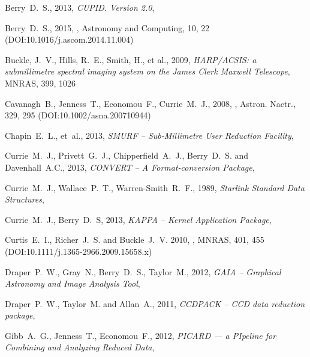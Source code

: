 \documentclass[11pt,oneside,chapters]{starlink}
\begin{document}
\begin{thebibliography}{}

Berry~D.~S., 2013, \textit{CUPID. Version 2.0}, 

Berry~D.~S., 2015, , Astronomy and Computing,
10, 22 (DOI:10.1016/j.ascom.2014.11.004)

Buckle, J.~V., Hills, R.~E., Smith, H., et al., 2009,
\textit{HARP/ACSIS: a submillimetre spectral imaging system on the James Clerk Maxwell Telescope},
MNRAS, 399, 1026

Cavanagh~B., Jenness~T., Economou~F., Currie~M.~J., 2008,
, Astron. Nactr., 329, 295 (DOI:10.1002/asna.200710944)

Chapin~E.~L., et~al., 2013, \textit{SMURF -- Sub-Millimetre User Reduction
Facility}, 

Currie~M.~J., Privett~G.~J., Chipperfield~A.~J., Berry~D.~S. and Davenhall~A.C., 2013,
\textit{CONVERT -- A Format-conversion Package}, 

Currie~M.~J., Wallace~P.~T., Warren-Smith~R.~F., 1989,
\textit{Starlink Standard Data Structures}, 

Currie~M.~J., Berry~D.~S, 2013, \textit{KAPPA -- Kernel Application Package},

Curtis~E.~I., Richer~J.~S. and Buckle~J.~V. 2010, , MNRAS, 401, 455 (DOI:10.1111/j.1365-2966.2009.15658.x)

Draper~P.~W., Gray~N., Berry~D.~S., Taylor~M., 2012,
\textit{GAIA -- Graphical Astronomy and Image Analysis Tool},

Draper~P.~W., Taylor~M. and Allan~A., 2011, \textit{CCDPACK -- CCD data reduction package},

Gibb~A.~G., Jenness~T., Economou~F., 2012, \textit{PICARD --- a
PIpeline for Combining and Analyzing Reduced Data},


\end{thebibliography}
\end{document}
